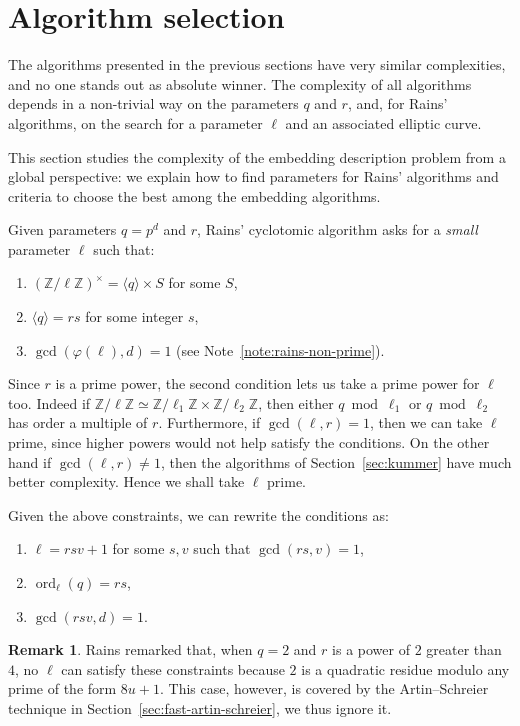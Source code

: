 \documentclass{mcom-l}
\theoremstyle{plain}
\theoremstyle{definition}
\newtheorem*{remark}{Remark}
\DeclareMathOperator{\order}{ord} %
\newcommand{\Z}{\ensuremath{\mathbb{Z}}}
\newcommand{\euler}{\ensuremath{\varphi}}
\newcounter{algorithm}
\begin{document}
\section{Algorithm selection}
\label{sec:selection}

The algorithms presented in the previous sections have very similar
complexities, and no one stands out as absolute winner. %
The complexity of all algorithms depends in a non-trivial way on the
parameters $q$ and $r$, and, for Rains' algorithms, on the search for
a parameter $\ell$ and an associated elliptic curve.

This section studies the complexity of the embedding description
problem from a global perspective: we explain how to find parameters
for Rains' algorithms and criteria to choose the best among the
embedding algorithms.

Given parameters $q=p^d$ and $r$, Rains' cyclotomic algorithm asks for
a \emph{small} parameter $\ell$ such that:
\begin{enumerate}
\item $(\Z/\ell\Z)^\times = \langle q\rangle \times S$ for some $S$,
\item $\langle q \rangle = rs$ for some integer $s$,
\item $\gcd(\euler(\ell),d)=1$ (see Note~\ref{note:rains-non-prime}).
\end{enumerate}

Since $r$ is a prime power, the second condition lets us take a prime
power for $\ell$ too. Indeed if
$\Z/\ell\Z\simeq\Z/\ell_1\Z\times\Z/\ell_2\Z$, then either
$q\bmod\ell_1$ or $q\bmod\ell_2$ has order a multiple of $r$.
Furthermore, if $\gcd(\ell,r)=1$, then we can take $\ell$ prime, since
higher powers would not help satisfy the conditions. On the other hand
if $\gcd(\ell,r)\ne1$, then the algorithms of Section~\ref{sec:kummer} have much
better complexity. Hence we shall take $\ell$ prime.

Given the above constraints, we can rewrite the conditions as:
\begin{enumerate}
\item $\ell = rsv + 1$ for some $s,v$ such that $\gcd(rs,v)=1$,
\item $\order_\ell(q) = rs$,
\item $\gcd(rsv,d)=1$.
\end{enumerate}

\begin{remark}
  Rains remarked that, when $q=2$ and $r$ is a power of $2$ greater
  than $4$, no $\ell$ can satisfy these constraints because $2$ is a
  quadratic residue modulo any prime of the form $8u+1$. This case,
  however, is covered by the Artin--Schreier technique in
  Section~\ref{sec:fast-artin-schreier}, we thus ignore it.
\end{remark}
\end{document}
